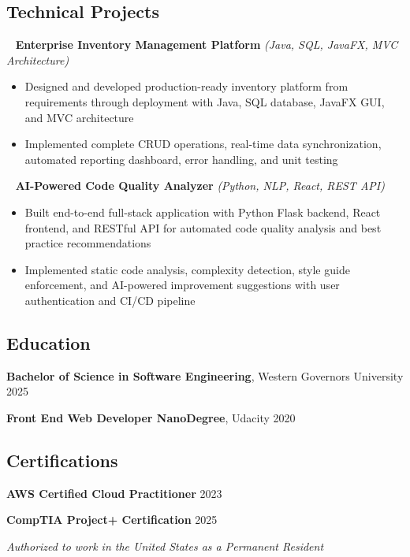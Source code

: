 \documentclass[11pt,letterpaper]{article}
\newcommand{\normalsizesection}{\normalsize}
\newcommand{\smallersection}{\small}
\newcommand{\sectionbox}[1]{%
    \vspace{0.1em}
    \begin{tcolorbox}[
        colback=sectionbg,
        colframe=sectionbg,
        width=\textwidth,
        left=5pt,
        right=5pt,
        top=2pt,
        bottom=2pt,
        boxrule=0pt,
        arc=0pt,
        boxsep=0pt,
    ]
    \section*{#1}
    \end{tcolorbox}
    \vspace{-0.4em}
}
\newcommand{\tech}[1]{\textit{(#1)}}
\newenvironment{projectentry}{%
    \leftskip=0cm
    \par\noindent
}{\par\leftskip=0cm\vspace{-2pt}}
\newenvironment{projectdesc}{%
    \footnotesize
    \begin{itemize}[leftmargin=*, topsep=0pt, itemsep=0pt, parsep=0pt]
}{\end{itemize}\smallersection\vspace{-1pt}}
\newcommand{\projicon}[1]{%
    {\small\color{gray!70}#1}~%
}
\begin{document}
\normalsizesection

\sectionbox{Technical Projects}
\smallersection


\begin{projectentry}
    \projicon{\faDatabase} \textbf{Enterprise Inventory Management Platform} \tech{Java, SQL, JavaFX, MVC Architecture}
\end{projectentry}
\begin{projectdesc}
    \item Designed and developed production-ready inventory platform from requirements through deployment with Java, SQL database, JavaFX GUI, and MVC architecture
    \item Implemented complete CRUD operations, real-time data synchronization, automated reporting dashboard, error handling, and unit testing
\end{projectdesc}

\begin{projectentry}
    \projicon{\faLaptopCode} \textbf{AI-Powered Code Quality Analyzer} \tech{Python, NLP, React, REST API}
\end{projectentry}
\begin{projectdesc}
    \item Built end-to-end full-stack application with Python Flask backend, React frontend, and RESTful API for automated code quality analysis and best practice recommendations
    \item Implemented static code analysis, complexity detection, style guide enforcement, and AI-powered improvement suggestions with user authentication and CI/CD pipeline
\end{projectdesc}

\normalsizesection

\sectionbox{Education}
\smallersection

\noindent\textbf{Bachelor of Science in Software Engineering}, Western Governors University \hfill 2025

\vspace{-2pt}
\noindent\textbf{Front End Web Developer NanoDegree}, Udacity \hfill 2020

\normalsizesection

\sectionbox{Certifications}
\smallersection

\noindent\textbf{AWS Certified Cloud Practitioner} \hfill 2023

\vspace{-2pt}
\noindent\textbf{CompTIA Project+ Certification} \hfill 2025

\vspace{2pt}

\normalsizesection

\vspace{2pt}
\begin{flushright}
\textit{Authorized to work in the United States as a Permanent Resident}
\end{flushright}
\end{document}
